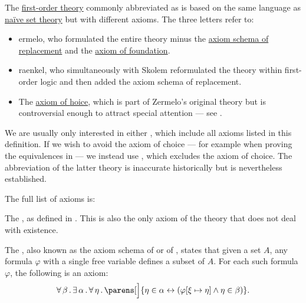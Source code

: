 \begin{definition}\label{def:zfc}
  The \hyperref[def:first_order_theory]{first-order theory} commonly abbreviated as  is based on the same language as \hyperref[def:naive_set_theory]{na\"ive set theory} but with different axioms. The three letters refer to:
  \begin{itemize}
    \item \textbf{}ermelo, who formulated the entire theory minus the \hyperref[def:zfc/replacement]{axiom schema of replacement} and the \hyperref[def:zfc/foundation]{axiom of foundation}.
    \item{} \textbf{}raenkel, who simultaneously with Skolem reformulated the theory within first-order logic and then added the axiom schema of replacement.
    \item The \hyperref[def:zfc/choice]{axiom of \textbf{}hoice}, which is part of Zermelo's original theory but is controversial enough to attract special attention --- see .
  \end{itemize}

  We are usually only interested in either , which include all axioms listed in this definition. If we wish to avoid the axiom of choice --- for example when proving the equivalences in  --- we instead use , which excludes the axiom of choice. The abbreviation of the latter theory is inaccurate historically but is nevertheless established.

  The full list of axioms is:
  \begin{thmenum}
     The , as defined in . This is also the only axiom of the theory that does not deal with existence.

     The , also known as the axiom schema of  or of , states that given a set \( A \), any formula \( \varphi \) with a single free variable defines a subset of \( A \). For each such formula \( \varphi \), the following is an axiom:
    \begin{equation}\label{eq:def:zfc/specification}
      \qforall \beta \qexists \alpha \qforall \eta \parens[\Big]{ \eta \in \alpha \leftrightarrow (\varphi[\xi \mapsto \eta] \wedge \eta \in \beta) }.
    \end{equation}


\end{thmenum}
\end{definition}
